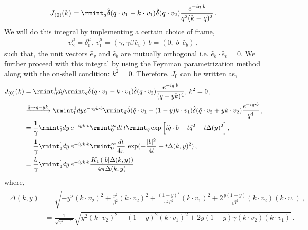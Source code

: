 \begin{align}
    \begin{split}
        J_{(0)}(k)=\rmint_{q}\hat\delta(q\cdot v_1-k\cdot v_1)\hat\delta(q\cdot v_2)\frac{e^{-iq\cdot b}}{q^2(k-q)^2}\,.\label{A.2}
    \end{split}
\end{align}
We will do this integral by implementing a certain choice of frame,
\begin{align}
    v_2^\mu=\delta^\mu_0,\,v_1^\mu=(\gamma,\gamma\beta \,\hat{e}_v)\,b=(0,|b|\,\hat{e}_b)\,,
\end{align}
such that, the unit vectors $\hat{e}_v$ and $\hat{e}_b$ are mutually orthogonal i.e. $\hat{e}_b \cdot \hat{e}_v=0$.
We further proceed with this integral by using the Feynman parametrization method along with the on-shell condition: $k^2=0$. Therefore, $J_0$ can be written as,
\begin{align}
    \begin{split}
        J_{(0)}(k)&=\rmint_0^1dy\rmint_q \hat\delta(q\cdot v_1-k\cdot v_1)\hat\delta(q\cdot v_2)\frac{e^{-iq\cdot b}}{(q-yk)^4},\,k^2=0\,,\\ &
        \xrightarrow[]{\bar q\rightarrow q-yk}\rmint_0^1 dy e^{-iy k\cdot b} \rmint_{\bar q}\hat\delta(\bar q\cdot v_1-(1-y)k\cdot v_1)\hat\delta(\bar q\cdot v_2+y k\cdot v_2)\frac{e^{-i\bar q\cdot b}}{\bar q^4}\,,\\ &
        =\frac{1}{\gamma}\rmint_{0}^1dy\,e^{-iyk\cdot b}\rmint_0^{\infty}dt\,t\rmint_{\tilde q}\exp\Big[i\tilde q\cdot b-t\tilde q^2-t\Delta(y)^2\Big]\,,\\ &
        =\frac{1}{\gamma}\rmint_{0}^1dy\,e^{-iyk\cdot b}\rmint_0^{\infty}\frac{dt}{4\pi}\, \exp(-\frac{|b|^2}{4t}-t\Delta(k,y)^2)\,,\\ &
       = \frac{b}{\gamma}\rmint_{0}^1dy\,e^{-iyk\cdot b}\frac{ K_1\left(|b| {\Delta(k,y) }\right)}{4 \pi  {\Delta(k,y) }}\label{C.4 mm}
    \end{split}
\end{align}
where, 
\begin{align}
    \begin{split}
       \Delta(k,y)&=\sqrt{-y^2(k\cdot v_2)^2+\frac{y^2}{\beta^2}(k\cdot v_2)^2+\frac{(1-y)^2}{\gamma^2\beta^2}(k\cdot v_1)^2+2\frac{y(1-y)}{\gamma\beta^2}(k\cdot v_2)(k\cdot v_1)}\,,\\ &
        =\frac{1}{\sqrt{\gamma^2-1}}\sqrt{y^2(k\cdot v_2)^2+(1-y)^2(k\cdot v_1)^2+2y(1-y)\gamma (k\cdot v_2)(k\cdot v_1)}\,.\label{A.4}
    \end{split}
\end{align}
